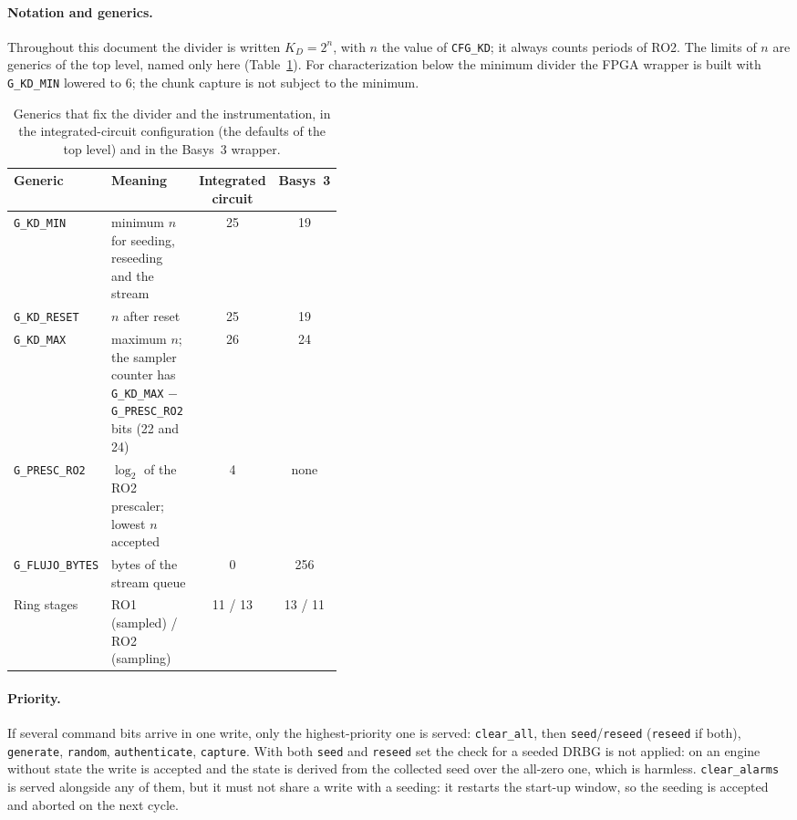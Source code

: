 \paragraph{Notation and generics.} Throughout this document the divider
is written $K_D = 2^{n}$, with $n$ the value of \texttt{CFG\_KD}; it
always counts periods of RO2. The limits of $n$ are generics of the top
level, named only here (Table~\ref{tab:app_generics}). For
characterization below the minimum divider the \ac{FPGA} wrapper is built
with \texttt{G\_KD\_MIN} lowered to 6; the chunk capture is not subject
to the minimum.

\begin{table}[htbp]
\centering\small
\caption{Generics that fix the divider and the instrumentation, in the
integrated-circuit configuration (the defaults of the top level) and in
the Basys~3 wrapper.}
\label{tab:app_generics}
\begin{tabular}{@{}l>{\raggedright\arraybackslash}p{0.42\linewidth}cc@{}}
\toprule
Generic & Meaning & Integrated circuit & Basys~3 \\
\midrule
\texttt{G\_KD\_MIN} & minimum $n$ for seeding, reseeding and the stream & 25 & 19 \\
\texttt{G\_KD\_RESET} & $n$ after reset & 25 & 19 \\
\texttt{G\_KD\_MAX} & maximum $n$; the sampler counter has
  \texttt{G\_KD\_MAX} $-$ \texttt{G\_PRESC\_RO2} bits (22 and 24) & 26 & 24 \\
\texttt{G\_PRESC\_RO2} & $\log_2$ of the RO2 prescaler; lowest $n$ accepted & 4 & none \\
\texttt{G\_FLUJO\_BYTES} & bytes of the stream queue & 0 & 256 \\
Ring stages & RO1 (sampled) / RO2 (sampling) & 11 / 13 & 13 / 11 \\
\bottomrule
\end{tabular}
\end{table}

\paragraph{Priority.} If several command bits arrive in one write, only
the highest-priority one is served: \texttt{clear\_all}, then
\texttt{seed}/\texttt{reseed} (\texttt{reseed} if both), \texttt{generate},
\texttt{random}, \texttt{authenticate}, \texttt{capture}. With both
\texttt{seed} and \texttt{reseed} set the check for a seeded \ac{DRBG} is
not applied: on an engine without state the write is accepted and the
state is derived from the collected seed over the all-zero one, which is
harmless.
\texttt{clear\_alarms} is served alongside any of them, but it must not
share a write with a seeding: it restarts the start-up window, so the
seeding is accepted and aborted on the next cycle.

